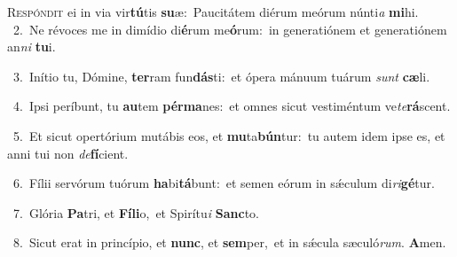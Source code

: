 \lettrine{\initial\textcolor{\initialcolor}{R}}{espóndit} ei in via vir\-\textbf{tú}\-tis \textbf{su}\-æ:~\star Paucitátem diérum meórum núnti\textit{a} \textbf{mi}\-hi.\\
{\numbfont\textcolor{\numbcolor}{~2.}}~Ne révoces me in dimídio di\-\textbf{é}\-rum me\-\textbf{ó}\-rum:~\star in generatiónem et generatiónem an\textit{ni} \textbf{tu}\-i.\par
{\numbfont\textcolor{\numbcolor}{~3.}}~Inítio tu, Dómine, \textbf{ter}\-ram fun\-\textbf{dás}\-ti:~\star et ópera mánuum tuárum \textit{sunt} \textbf{cæ}\-li.\par
{\numbfont\textcolor{\numbcolor}{~4.}}~Ipsi períbunt, tu \textbf{au}\-tem \textbf{pér}\-\textbf{ma}nes:~\star et omnes sicut vestiméntum ve\-\textit{te}\-\textbf{rá}scent.\par
{\numbfont\textcolor{\numbcolor}{~5.}}~Et sicut opertórium mutábis eos, et \textbf{mu}\-ta\-\textbf{bún}\-tur:~\star tu autem idem ipse es, et anni tui non \textit{de}\-\textbf{fí}cient.\par
{\numbfont\textcolor{\numbcolor}{~6.}}~Fílii servórum tuórum \textbf{ha}\-bi\-\textbf{tá}\-bunt:~\star et semen eórum in sǽculum di\-\textit{ri}\-\textbf{gé}tur.\par
{\numbfont\textcolor{\numbcolor}{~7.}}~Glória \textbf{Pa}\-tri, et \textbf{Fí}\-\textbf{li}o,~\star et Spirítu\textit{i} \textbf{Sanc}\-to.\par
{\numbfont\textcolor{\numbcolor}{~8.}}~Sicut erat in princípio, et \textbf{nunc}\-, et \textbf{sem}\-per,~\star et in sǽcula sæculó\-\textit{rum}\-. \textbf{A}\-men.\par
